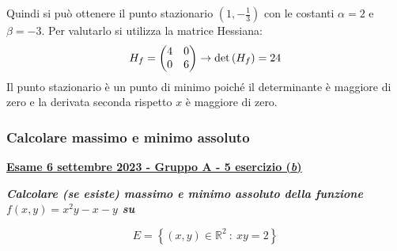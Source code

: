 \documentclass[a4paper]{article}
\makeatletter
\newcommand{\definition}[1]{\textcolor{Red3}{\textbf{#1}}}
\newcommand{\example}[1]{\textcolor{Green4}{\textbf{#1}}}
\newenvironment{rowequmat}[1]{\left(\array{@{}#1@{}}}{\endarray\right)}
\makeatother
\begin{document}
	Quindi si può ottenere il punto stazionario $\left(1,-\frac{1}{3}\right)$ con le costanti $\alpha = 2$ e $\beta = -3$. Per valutarlo si utilizza la matrice Hessiana:
	\begin{equation*}
		H_{f} = \begin{rowequmat}{c c}
			4 & 0 \\
			0 & 6
		\end{rowequmat}
		\rightarrow
		\det\left(H_{f}\right) = 24
	\end{equation*}
	Il punto stazionario è un punto di minimo poiché il determinante è maggiore di zero e la derivata seconda rispetto $x$ è maggiore di zero.

	\newpage

	\subsubsection{Calcolare massimo e minimo assoluto}

	\begin{flushleft}
		\label{exam: esame 06 settembre 2023 - Gruppo A - 5 esercizio (b)}
		\hypertarget{
			exam: esame 06 settembre 2023 - Gruppo A - 5 esercizio (b)
		}{
			\definition{\underline{Esame 6 settembre 2023 - Gruppo A - 5 esercizio (\emph{b})}}
		}
	\end{flushleft}
	\example{\emph{Calcolare (se esiste) massimo e minimo assoluto della funzione $f\left(x,y\right) = x^{2}y - x -y$ su}}
	
	\example{\begin{equation*}
		E = \left\{\left(x,y\right) \in \mathbb{R}^{2} \: : \: xy = 2\right\}
	\end{equation*}}
\end{document}
